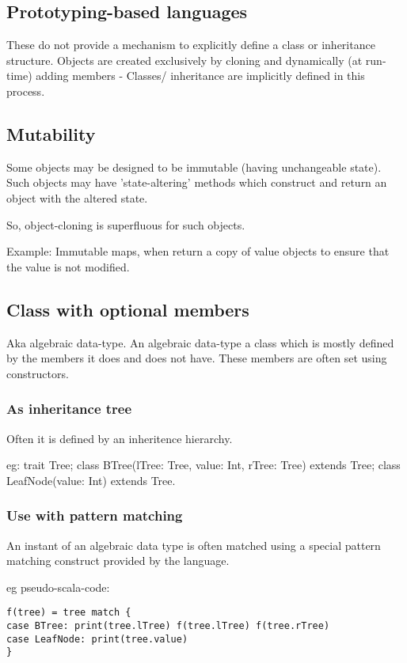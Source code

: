 \documentclass[oneside, article]{memoir}
\begin{document}
\subsection{Prototyping-based languages}
These do not provide a mechanism to explicitly define a class or inheritance structure. Objects are created exclusively by cloning and dynamically (at run-time) adding members - Classes/ inheritance are implicitly defined in this process.

\subsection{Mutability}
Some objects may be designed to be immutable (having unchangeable state). Such objects may have 'state-altering' methods which construct and return an object with the altered state.

So, object-cloning is superfluous for such objects.

Example: Immutable maps, when return a copy of value objects to ensure that the value is not modified.

\subsection{Class with optional members}
Aka algebraic data-type. An algebraic data-type a class which is mostly defined by the members it does and does not have. These members are often set using constructors.

\subsubsection{As inheritance tree}
Often it is defined by an inheritence hierarchy.

eg: trait Tree; class BTree(lTree: Tree, value: Int, rTree: Tree) extends Tree; class LeafNode(value: Int) extends Tree.

\subsubsection{Use with pattern matching}
An instant of an algebraic data type is often matched using a special pattern matching construct provided by the language.

eg pseudo-scala-code:
\begin{verbatim}
f(tree) = tree match {
case BTree: print(tree.lTree) f(tree.lTree) f(tree.rTree)
case LeafNode: print(tree.value)
}
\end{verbatim}
\end{document}
